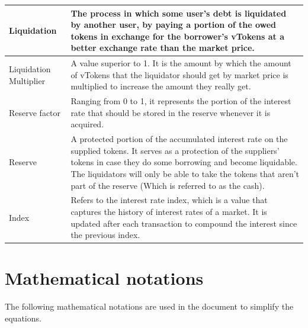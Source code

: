 \begin{tabularx}{\linewidth}{|l|X|}
  Liquidation & The process in which some user's debt is liquidated by another user, by paying a portion of the owed tokens in exchange for the borrower's vTokens at a better exchange rate than the market price. \\\hline

  Liquidation Multiplier & A value superior to 1. It is the amount by which the amount of vTokens that the liquidator should get by market price is multiplied to increase the amount they really get. \\\hline

  Reserve factor & Ranging from 0 to 1, it represents the portion of the interest rate that should be stored in the reserve whenever it is acquired. \\\hline

  Reserve & A protected portion of the accumulated interest rate on the supplied tokens. It serves as a protection of the suppliers' tokens in case they do some borrowing and become liquidable. The liquidators will only be able to take the tokens that aren't part of the reserve (Which is referred to as the cash). \\\hline

  Index & Refers to the interest rate index, which is a value that captures the history of interest rates of a market. It is updated after each transaction to compound the interest since the previous index. \\\hline
\end{tabularx}

\newpage
\section{Mathematical notations}
\label{spec:mn}
The following mathematical notations are used in the document to simplify the equations.

\newcommand\USD{\mathit{USD}}

\newcommand\T[1]{\mathit{T_{#1}}}
\newcommand\vT[1]{\mathit{vT(#1)}}

\newcommand\ER[2]{\mathit{ER(#1, #2)}}
\newcommand\TBA[1]{\mathit{TBA(#1)}}

\newcommand\UR[1]{\mathit{UR(#1)}}
\newcommand\UMul[1]{\mathit{UM(#1)}}
\newcommand\UBR[1]{\mathit{UbR(#1)}}
\newcommand\BIR[1]{\mathit{BIR(#1)}}
\newcommand\RF[1]{\mathit{RF(#1)}}

\newcommand\RTB[1]{\mathit{rTB(#1)}}
\newcommand\VTB[1]{\mathit{vTB(#1)}}
\newcommand\RES[1]{\mathit{Res(#1)}}

